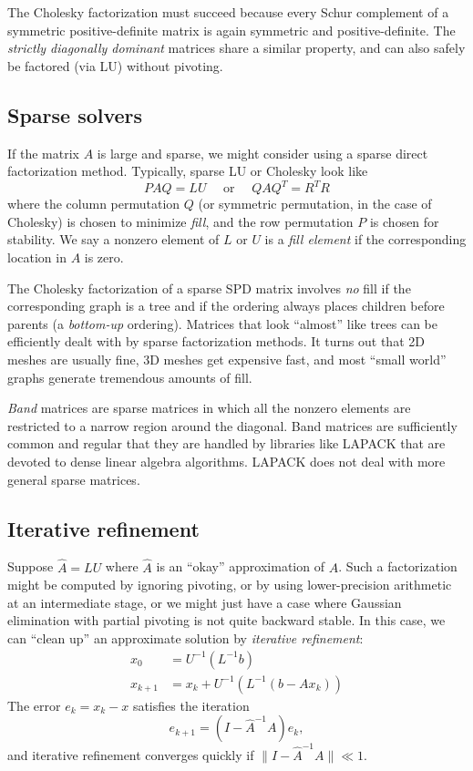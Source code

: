 \documentclass[12pt, leqno]{article}
\begin{document}
The Cholesky factorization must succeed because every Schur complement
of a symmetric positive-definite matrix is again symmetric and
positive-definite.  The {\em strictly diagonally dominant} matrices
share a similar property, and can also safely be factored (via LU)
without pivoting.

\subsection{Sparse solvers}

If the matrix $A$ is large and sparse, we might consider using a
sparse direct factorization method.  Typically, sparse LU or
Cholesky look like
\[
  PAQ = LU \quad \mbox{ or } \quad QAQ^T = R^T R
\]
where the column permutation $Q$ (or symmetric permutation, in
the case of Cholesky) is chosen to minimize {\em fill}, and
the row permutation $P$ is chosen for stability.  We say a nonzero
element of $L$ or $U$ is a {\em fill element} if the corresponding
location in $A$ is zero.

The Cholesky factorization of a sparse SPD matrix involves {\em no}
fill if the corresponding graph is a tree and if the ordering
always places children before parents (a {\em bottom-up} ordering).
Matrices that look ``almost'' like trees can be efficiently dealt
with by sparse factorization methods.  It turns out that 2D meshes
are usually fine, 3D meshes get expensive fast, and most ``small
world'' graphs generate tremendous amounts of fill.

{\em Band} matrices are sparse matrices in which all the nonzero
elements are restricted to a narrow region around the diagonal.
Band matrices are sufficiently common and regular that they are
handled by libraries like LAPACK that are devoted to dense linear
algebra algorithms.  LAPACK does not deal with more general sparse
matrices.

\subsection{Iterative refinement}

Suppose $\hat{A} = LU$ where $\hat{A}$ is an ``okay'' approximation
of $A$.  Such a factorization might be computed by ignoring pivoting,
or by using lower-precision arithmetic at an intermediate stage,
or we might just have a case where Gaussian elimination with partial
pivoting is not quite backward stable.  In this case, we can ``clean
up'' an approximate solution by {\em iterative refinement}:
\begin{align*}
x_0 &= U^{-1} (L^{-1} b) \\
x_{k+1} &= x_k + U^{-1} (L^{-1} (b-Ax_k))
\end{align*}
The error $e_k = x_k-x$ satisfies the iteration
\[
  e_{k+1} = (I-\hat{A}^{-1} A) e_k,
\]
and iterative refinement converges quickly if
$\|I-\hat{A}^{-1} A\| \ll 1$.
\end{document}
